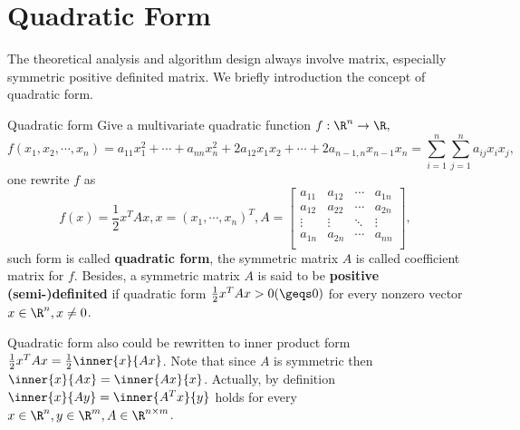 \section{Quadratic Form}

The theoretical analysis and algorithm design always involve matrix, especially symmetric positive definited matrix. We briefly introduction the concept of quadratic form.
\begin{definition}{Quadratic form}{}
    Give a multivariate quadratic function $f:\R^n\to \R,$
    \begin{equation*}
        f(x_1,x_2,\cdots,x_n) = a_{11}x_1^2+\cdots+a_{nn}x^2_n+2a_{12}x_1x_2+\cdots + 2a_{n-1,n}x_{n-1}x_n =\sum_{i=1}^n\sum_{j=1}^na_{ij}x_ix_j,
    \end{equation*}
    one rewrite $f$ as 
    \begin{equation*}
        f(x) = \frac{1}{2}x^TAx,x=(x_1,\cdots,x_n)^T,A=\begin{bmatrix}
        a_{11}&a_{12}&\cdots & a_{1n}\\
        a_{12}&a_{22}&\cdots & a_{2n}\\
        \vdots&\vdots&\ddots&\vdots\\
        a_{1n}&a_{2n}&\cdots & a_{n n}\\
        \end{bmatrix},
    \end{equation*}
    such form is called \textbf{quadratic form}, the symmetric matrix $A$ is called coefficient matrix for $f$. Besides, a symmetric matrix $A$ is said to be \textbf{positive (semi-)definited} if quadratic form $\frac{1}{2}x^TAx>0(\geqs 0)$ for every nonzero vector $x\in \R^n,x\ne 0$.
\end{definition}
\begin{remark}
    Quadratic form also could be rewritten to inner product form $\frac{1}{2}x^TAx = \frac{1}{2}\inner{x}{Ax}$. Note that since $A$ is symmetric then $\inner{x}{Ax} = \inner{Ax}{x}$. Actually, by definition $\inner{x}{Ay}=\inner{A^Tx}{y}$ holds for every $x\in \R^n,y\in \R^m,A\in \R^{n\times m}$.
\end{remark}


